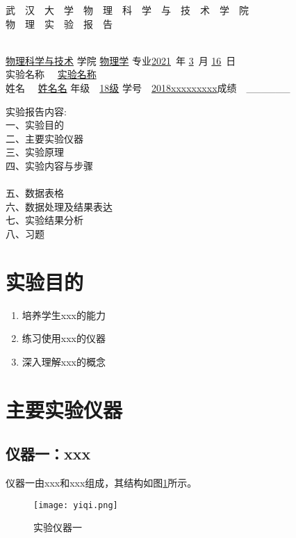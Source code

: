 \documentclass{Physics_Report}
\newcommand{\department}{物理科学与技术}
\newcommand{\major}{物理学}
\newcommand{\Year}{2021}
\newcommand{\Month}{3}
\newcommand{\Date}{16}
\newcommand{\exptitle}{实验名称}
\newcommand{\stuid}{2018xxxxxxxxx}
\newcommand{\name}{姓名名}
\newcommand{\grade}{18级}
\begin{document}
\begin{center}
	\kaishu 武\ \ 汉\ \ 大\ \ 学\ \ 物\ \ 理\ \ 科\ \ 学\ \ 与\ \ 技\ \ 术\ \ 学\ \ 院\\
	物\ \ 理\ \ 实\ \ 验\ \ 报\ \ 告\\
	~\\
	
\end{center}
\song {}\underline{\department} 学院 \qquad\qquad \underline{\major} 专业\qquad\qquad \underline{\Year}\ 年 \underline{\Month}\ 月 \underline{\Date}\ 日\\
实验名称 \ \ \underline{\exptitle}\\
姓名 \ \ \underline{\name} \qquad 年级\ \ \underline{\grade} \qquad 学号\ \ \underline{\stuid}\qquad  成绩\ \ \_\_\_\_\_\_
\begin{multicols}{2}
\noindent 实验报告内容:\\
 一、实验目的\\二、主要实验仪器\\三、实验原理\\四、实验内容与步骤~\\\\五、数据表格\\六、数据处理及结果表达\\七、实验结果分析\\八、习题
\end{multicols}

\section{实验目的}
\begin{enumerate}
	\item 培养学生xxx的能力
	\item 练习使用xxx的仪器
	\item 深入理解xxx的概念
\end{enumerate}

\section{主要实验仪器}
\subsection{仪器一：xxx}
仪器一由xxx和xxx组成，其结构如图\ref{yiqi}所示。
\begin{figure}[htbp]
	\centering
	\texttt{[image: yiqi.png]}
	\caption{实验仪器一}
	\label{yiqi}
\end{figure}
\end{document}
